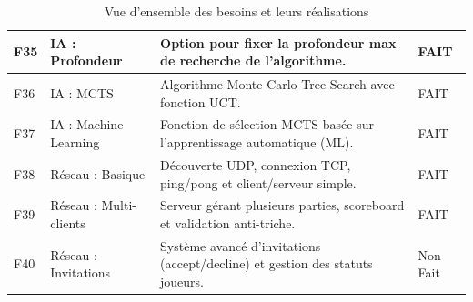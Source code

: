\documentclass[a4paper]{article}
\begin{document}
\begin{table}[H]
\begin{tabular}{|p{1.5cm}|p{3cm}|p{8.5cm}|p{2cm}|}
        \hline
        F35 & IA : Profondeur & Option pour fixer la profondeur max de recherche de l'algorithme. & FAIT \\
        \hline
        F36 & IA : MCTS & Algorithme Monte Carlo Tree Search avec fonction UCT. & FAIT \\
        \hline
        F37 & IA : Machine Learning & Fonction de sélection MCTS basée sur l'apprentissage automatique (ML). & FAIT \\
        \hline
        F38 & Réseau : Basique & Découverte UDP, connexion TCP, ping/pong et client/serveur simple. & FAIT \\
        \hline
        F39 & Réseau : Multi-clients & Serveur gérant plusieurs parties, scoreboard et validation anti-triche. &  FAIT \\
        \hline
        F40 & Réseau : Invitations & Système avancé d'invitations (accept/decline) et gestion des statuts joueurs. & Non Fait\\
        \hline
    \end{tabular}
    \caption{Vue d'ensemble des besoins et leurs réalisations}
    \label{tab:besoins4colonnes}
\end{table}
\end{document}
